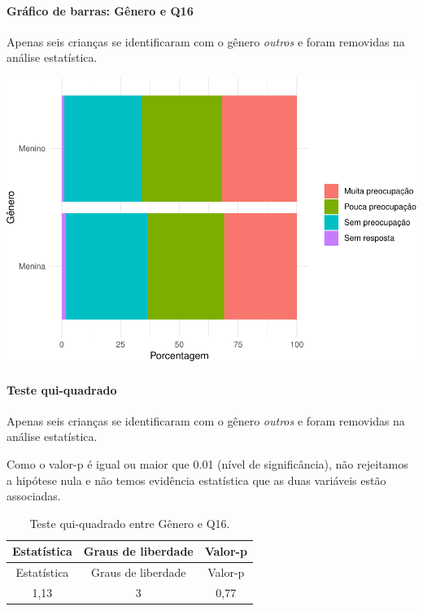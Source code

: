 \documentclass[]{article}
\let\oldparagraph\paragraph
\renewcommand{\paragraph}[1]{\oldparagraph{#1}\mbox{}}
\begin{document}
\hypertarget{gruxe1fico-de-barras-guxeanero-e-q16}{%
\paragraph{Gráfico de barras: Gênero e Q16}\label{gruxe1fico-de-barras-guxeanero-e-q16}}

Apenas seis crianças se identificaram com o gênero \emph{outros} e foram removidas na análise estatística.

\begin{center}\includegraphics[width=0.75\linewidth]{relatorio_covid19_files/figure-latex/unnamed-chunk-142-1} \end{center}

\hypertarget{teste-qui-quadrado-13}{%
\paragraph{Teste qui-quadrado}\label{teste-qui-quadrado-13}}

Apenas seis crianças se identificaram com o gênero \emph{outros} e foram removidas na análise estatística.

Como o valor-p é igual ou maior que 0.01 (nível de significância), não rejeitamos a hipótese nula e não temos evidência estatística que as duas variáveis estão associadas.

\begin{longtable}[]{@{}ccc@{}}
\caption{\label{tab:unnamed-chunk-144}Teste qui-quadrado entre Gênero e Q16.}\tabularnewline
\toprule
Estatística & Graus de liberdade & Valor-p\tabularnewline
\midrule
\endfirsthead
\toprule
Estatística & Graus de liberdade & Valor-p\tabularnewline
\midrule
\endhead
1,13 & 3 & 0,77\tabularnewline
\bottomrule
\end{longtable}

\cleardoublepage
\end{document}
